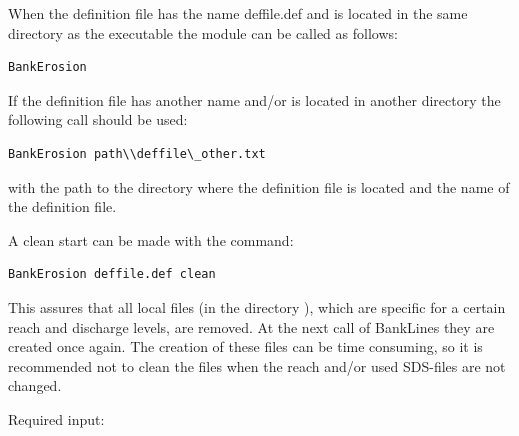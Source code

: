 When the definition file has the name deffile.def and is located in the same directory as the executable the module can be called as follows:

\begin{Verbatim}
BankErosion
\end{Verbatim}

If the definition file has another name and/or is located in another directory the following call should be used:

\begin{Verbatim}
BankErosion path\\deffile\_other.txt
\end{Verbatim}

with  the path to the directory where the definition file is located and  the name of the definition file.

A clean start can be made with the command:

\begin{Verbatim}
BankErosion deffile.def clean
\end{Verbatim}

This assures that all local files (in the directory ), which are specific for a certain reach and discharge levels, are removed.
At the next call of BankLines they are created once again.
The creation of these files can be time consuming, so it is recommended not to clean the files when the reach and/or used SDS-files are not changed.

Required input:

